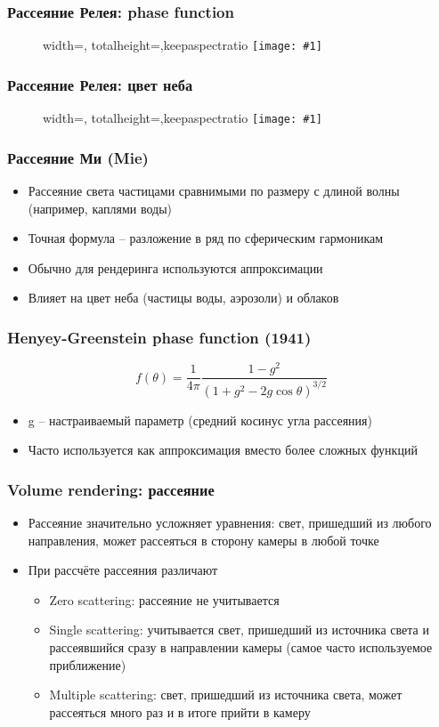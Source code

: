 \documentclass[10pt]{beamer}
\newcommand{\slideimage}[1]{
  \begin{figure}
    \begin{adjustbox}{width=\textwidth, totalheight=\textheight-2\baselineskip-2\baselineskip,keepaspectratio}
      \texttt{[image: \#1]}
    \end{adjustbox}
  \end{figure}
}
\begin{document}
\begin{frame}[fragile]
\frametitle{Рассеяние Релея: phase function}
\slideimage{rayleigh-phase.png}
\end{frame}

\begin{frame}[fragile]
\frametitle{Рассеяние Релея: цвет неба}
\slideimage{sky.jpg}
\end{frame}

\begin{frame}[fragile]
\frametitle{Рассеяние Ми (Mie)}
\begin{itemize}
\item Рассеяние света частицами сравнимыми по размеру с длиной волны (например, каплями воды)
\pause
\item Точная формула -- разложение в ряд по сферическим гармоникам
\pause
\item Обычно для рендеринга используются аппроксимации
\pause
\item Влияет на цвет неба (частицы воды, аэрозоли) и облаков
\end{itemize}
\end{frame}

\begin{frame}[fragile]
\frametitle{Henyey-Greenstein phase function (1941)}
\begin{equation}f(\theta) = \frac{1}{4\pi}\frac{1-g^2}{\left(1+g^2 - 2g\cos\theta\right)^{3/2}}\end{equation}
\begin{itemize}
\item g -- настраиваемый параметр (средний косинус угла рассеяния)
\item Часто используется как аппроксимация вместо более сложных функций
\end{itemize}
\end{frame}

\begin{frame}[fragile]
\frametitle{Volume rendering: рассеяние}
\begin{itemize}
\item Рассеяние значительно усложняет уравнения: свет, пришедший из любого направления, может рассеяться в сторону камеры в любой точке
\pause
\item При рассчёте рассеяния различают
\begin{itemize}
\item Zero scattering: рассеяние не учитывается
\item Single scattering: учитывается свет, пришедший из источника света и рассеявшийся сразу в направлении камеры (самое часто используемое приближение)
\item Multiple scattering: свет, пришедший из источника света, может рассеяться много раз и в итоге прийти в камеру
\end{itemize}
\end{itemize}
\end{frame}
\end{document}

